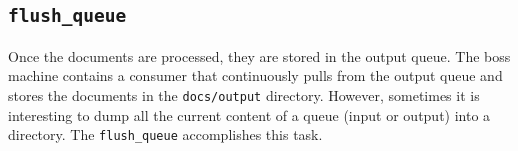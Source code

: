 \documentclass[a4]{article}
\begin{document}




\subsection*{\texttt{flush\_queue}}
\label{sec:flush_queue}

Once the documents are processed, they are stored in the output queue. The
boss machine contains a consumer that continuously pulls from the output
queue and stores the documents in the \texttt{docs/output}
directory. However, sometimes it is interesting to dump all the current
content of a queue (input or output) into a directory. The
\texttt{flush\_queue} accomplishes this task.
\end{document}
